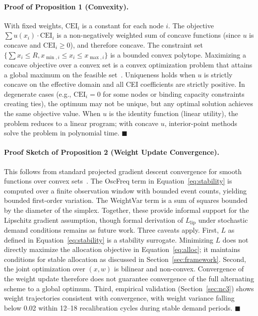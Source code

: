 \documentclass[runningheads]{llncs}
\begin{document}
\paragraph{Proof of Proposition 1 (Convexity).} With fixed weights, $\text{CEI}_i$ is a constant for each node $i$. The objective $\sum u(x_i) \cdot \text{CEI}_i$ is a non-negatively weighted sum of concave functions (since $u$ is concave and $\text{CEI}_i \geq 0$), and therefore concave. The constraint set $\{\sum x_i \leq R, x_{\min,i} \leq x_i \leq x_{\max,i}\}$ is a bounded convex polytope. Maximizing a concave objective over a convex set is a convex optimization problem that attains a global maximum on the feasible set~\cite{boyd}. Uniqueness holds when $u$ is strictly concave on the effective domain and all CEI coefficients are strictly positive. In degenerate cases (e.g., $\text{CEI}_i = 0$ for some nodes or binding capacity constraints creating ties), the optimum may not be unique, but any optimal solution achieves the same objective value. When $u$ is the identity function (linear utility), the problem reduces to a linear program; with concave $u$, interior-point methods solve the problem in polynomial time. $\blacksquare$

\paragraph{Proof Sketch of Proposition 2 (Weight Update Convergence).} This follows from standard projected gradient descent convergence for smooth functions over convex sets~\cite{boyd}. The OscFreq term in Equation~\ref{eq:stability} is computed over a finite observation window with bounded event counts, yielding bounded first-order variation. The WeightVar term is a sum of squares bounded by the diameter of the simplex. Together, these provide informal support for the Lipschitz gradient assumption, though formal derivation of $L_{\text{lip}}$ under stochastic demand conditions remains as future work. Three caveats apply. First, $L$ as defined in Equation~\ref{eq:stability} is a stability surrogate. Minimizing $L$ does not directly maximize the allocation objective in Equation~\ref{eq:alloc}; it maintains conditions for stable allocation as discussed in Section~\ref{sec:framework}. Second, the joint optimization over $(x, w)$ is bilinear and non-convex. Convergence of the weight update therefore does not guarantee convergence of the full alternating scheme to a global optimum. Third, empirical validation (Section~\ref{sec:nc3}) shows weight trajectories consistent with convergence, with weight variance falling below 0.02 within 12--18 recalibration cycles during stable demand periods. $\blacksquare$
\end{document}
